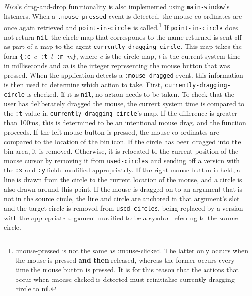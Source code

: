 \documentclass[12pt,twoside,notitlepage,xetex]{report}
\begin{document}
\emph{Nico}'s drag-and-drop functionality is also implemented using
\verb¬main-window¬'s listeners.  When a \verb¬:mouse-pressed¬ event is
detected, the mouse co-ordinates are once again retrieved and
\verb¬point-in-circle¬ is called.\footnote{{\ttfamily :mouse-pressed} is not
the same as {\ttfamily :mouse-clicked}.  The latter only occurs when the mouse
is pressed {\bf and then} released, whereas the former occurs every time the
mouse button is pressed.  It is for this reason that the actions that occur
when {\ttfamily :mouse-clicked} is detected must reinitialise
{\ttfamily currently-dragging-circle} to {\ttfamily nil}.}  If
\verb¬point-in-circle¬ does not return \verb¬nil¬, the circle map that
corresponds to the name returned is sent off as part of a map to the agent
\verb¬currently-dragging-circle¬.  This map takes the form
\verb¬{:c ¬\emph{c}\verb¬ :t ¬\emph{t}\verb¬ :m ¬\emph{m}\verb¬}¬, where
\emph{c} is the circle map, \emph{t} is the current system time in milliseconds
and \emph{m} is the integer representing the mouse button that was pressed.
When the application detects a \verb¬:mouse-dragged¬ event, this information is
then used to determine which action to take.  First,
\verb¬currently-dragging-circle¬ is checked.  If it is \verb¬nil¬, no action
needs to be taken.  To check that the user has deliberately dragged the mouse,
the current system time is compared to the \verb¬:t¬ value in
\verb¬currently-dragging-circle¬'s map.  If the difference is greater than
100ms, this is determined to be an intentional mouse drag, and the function
proceeds.  If the left mouse button is pressed, the mouse co-ordinates are
compared to the location of the bin icon.  If the circle has been dragged into
the bin area, it is removed.  Otherwise, it is relocated to the current
position of the mouse cursor by removing it from \verb¬used-circles¬ and
sending off a version with the \verb¬:x¬ and \verb¬:y¬ fields modified
appropriately.  If the right mouse button is held, a line is drawn from the
circle to the current location of the mouse, and a circle is also drawn around
this point.  If the mouse is dragged on to an argument that is not in the
source circle, the line and circle are anchored in that argument's slot and the
target circle is removed from \verb¬used-circles¬, being replaced by a version
with the appropriate argument modified to be a symbol referring to the source
circle.
\end{document}
